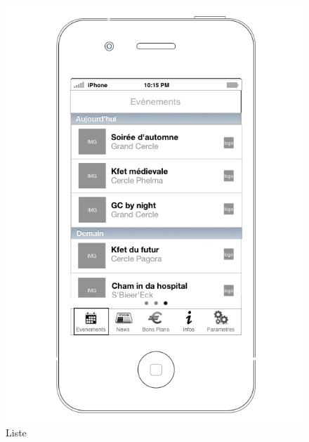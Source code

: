 \documentclass[a4paper, 11px]{article}
\begin{document}
\begin{figure}[htbp]
\begin{minipage}[c]{.33\linewidth}
	\end{minipage}
	\hfill
	\begin{minipage}[c]{.33\linewidth}
		\begin{center}
			\includegraphics[scale=0.3]{../../Sketch/iOS/evenements_liste.png}
		\end{center}
	\caption{Liste}
	\label{even_liste}


\end{minipage}
\end{figure}
\end{document}
